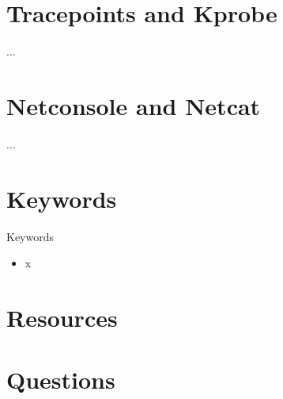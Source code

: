 \documentclass{workshop}
\begin{document}
\section{Tracepoints and Kprobe}
\begin{frame}{...}
\end{frame}

\section{Netconsole and Netcat}
\begin{frame}{...}
\end{frame}

\section{Keywords}
\begin{frame}{Keywords}
      \begin{itemize}
        \item x
      \end{itemize}
\end{frame}

\section{Resources}

\section{Questions}
\end{document}
